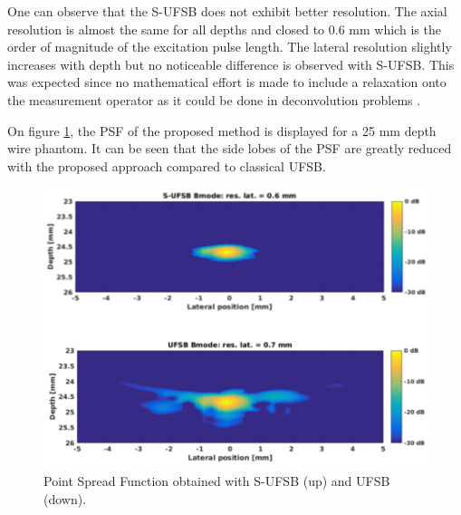 \documentclass[conference]{IEEEtran}
\begin{document}
\begin{table}[htb]
\caption{Spatial resolution values measured from the UlaOP scanner with high power probe}
\centering
{}
\label{tab:LatRes_depth}
\end{table}
One can observe that the S-UFSB does not exhibit better resolution. The axial resolution is almost the same for all depths and closed to 0.6 mm which is the order of magnitude of the excitation pulse length. The lateral resolution slightly increases with depth but no noticeable difference is observed with S-UFSB. This was expected since no mathematical effort is made to include a relaxation onto the measurement operator as it could be done in deconvolution problems \cite{Morin_ICIP_2013}.

On figure \ref{fig:PSF}, the PSF of the proposed method is displayed for a 25 mm depth wire phantom. It can be seen that the side lobes of the PSF are greatly reduced with the proposed approach compared to classical UFSB. 
\begin{figure}[htb]
\centering    
\includegraphics[scale = 0.8]{SpatialRes}
\caption{Point Spread Function obtained with S-UFSB (up) and UFSB (down).}
\label{fig:PSF}
\end{figure}
\end{document}
